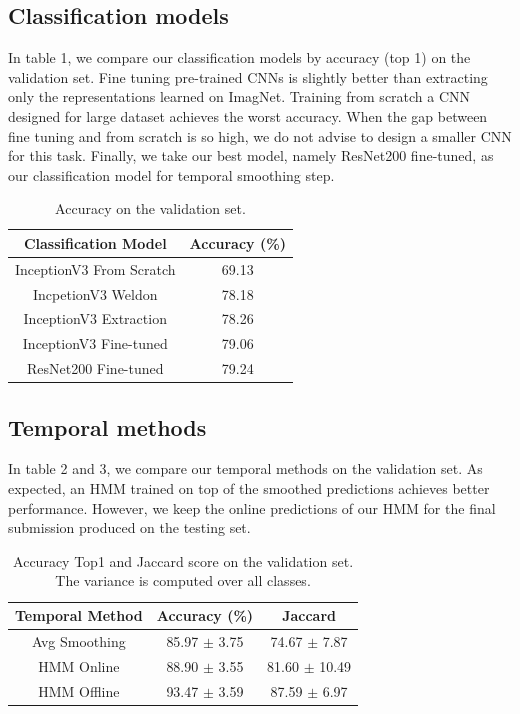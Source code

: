 \documentclass[10pt,twocolumn,letterpaper]{article}
\begin{document}
\subsection{Classification models}

In table 1, we compare our classification models by accuracy (top 1) on the validation set. Fine tuning pre-trained CNNs is slightly better than extracting only the representations learned on ImagNet. Training from scratch a CNN designed for large dataset achieves the worst accuracy. When the gap between fine tuning and from scratch is so high, we do not advise to design a smaller CNN for this task. Finally, we take our best model, namely ResNet200 fine-tuned, as our classification model for temporal smoothing step.

\begin{table}
	\begin{center}
		\begin{tabular}{|c|c|}
			\hline
			Classification Model & Accuracy (\%) \\
			\hline\hline
			InceptionV3 From Scratch & 69.13 \\
			IncpetionV3 Weldon & 78.18 \\
			InceptionV3 Extraction & 78.26 \\
			InceptionV3 Fine-tuned & 79.06 \\
			ResNet200 Fine-tuned & 79.24 \\
			\hline
		\end{tabular}
	\end{center}
	\caption{Accuracy on the validation set.}
\end{table}

\subsection{Temporal methods}

In table 2 and 3, we compare our temporal methods on the validation set. As expected, an HMM trained on top of the smoothed predictions achieves better performance. However, we keep the online predictions of our HMM for the final submission produced on the testing set.

\begin{table}
	\begin{center}
		\begin{tabular}{|c|c|c|}
			\hline
			Temporal Method & Accuracy (\%) & Jaccard \\
			\hline\hline
			Avg Smoothing & 85.97 $\pm$ 3.75 & 74.67 $\pm$ 7.87\\
			HMM Online & 88.90 $\pm$ 3.55 & 81.60 $\pm$ 10.49\\
			HMM Offline & 93.47 $\pm$ 3.59 & 87.59 $\pm$ 6.97\\
			\hline
		\end{tabular}
	\end{center}
	\caption{Accuracy Top1 and Jaccard score on the validation set. The variance is computed over all classes.}
\end{table}
\end{document}
